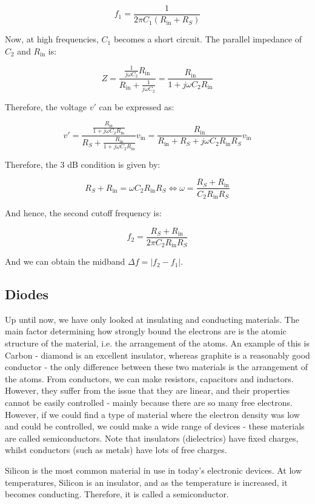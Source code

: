 \documentclass{article}
\begin{document}
\[ f_1 = \frac{1}{2\pi C_1(R_{\text{in}} + R_S)} \]

Now, at high frequencies, $C_1$ becomes a short circuit. The parallel impedance of $C_2$ and $R_{\text{in}}$ is:

\[ Z = \frac{\frac{1}{j\omega C_2} R_{\text{in}}}{R_{\text{in}} + \frac{1}{j\omega C_2}} = \frac{R_{\text{in}}}{1 + j\omega C_2R_{\text{in}}}\]

Therefore, the voltage $v'$ can be expressed as:

\[ v' = \frac{\frac{R_{\text{in}}}{1 + j\omega C_2R_{\text{in}}}}{R_S + \frac{R_{\text{in}}}{1 + j\omega C_2R_{\text{in}}}}v_{\text{in}} = \frac{R_{\text{in}}}{R_{\text{in}} + R_S + j\omega C_2R_{\text{in}}R_S}v_{\text{in}} \]

Therefore, the $3$ dB condition is given by:

\[ R_S + R_{\text{in}} = \omega C_2R_{\text{in}}R_S \iff \omega = \frac{R_S + R_{\text{in}}}{C_2R_{\text{in}}R_S} \]

And hence, the second cutoff frequency is:

\[ f_2 = \frac{R_S + R_{\text{in}}}{2\pi C_2R_{\text{in}}R_S} \]

And we can obtain the midband $\Delta f = |f_2 - f_1|.$

\newpage

\subsection{Diodes}

Up until now, we have only looked at insulating and conducting materials. The main factor determining how strongly bound the electrons are is the atomic structure of the material, i.e. the arrangement of the atoms. An example of this is Carbon - diamond is an excellent insulator, whereas graphite is a reasonably good conductor - the only difference between these two materials is the arrangement of the atoms. From conductors, we can make resistors, capacitors and inductors. However, they suffer from the issue that they are linear, and their properties cannot be easily controlled - mainly because there are so many free electrons. However, if we could find a type of material where the electron density was low and could be controlled, we could make a wide range of devices - these materials are called semiconductors. Note that insulators (dielectrics) have fixed charges, whilst conductors (such as metals) have lots of free charges.

Silicon is the most common material in use in today's electronic devices. At low temperatures, Silicon is an insulator, and as the temperature is increased, it becomes conducting. Therefore, it is called a semiconductor. 
\end{document}
